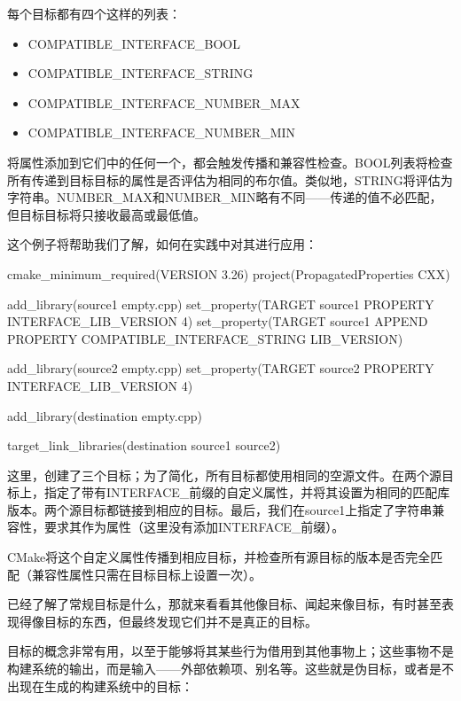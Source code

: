 每个目标都有四个这样的列表：

\begin{itemize}
\item
COMPATIBLE\_INTERFACE\_BOOL

\item
COMPATIBLE\_INTERFACE\_STRING

\item
COMPATIBLE\_INTERFACE\_NUMBER\_MAX

\item
COMPATIBLE\_INTERFACE\_NUMBER\_MIN
\end{itemize}

将属性添加到它们中的任何一个，都会触发传播和兼容性检查。BOOL列表将检查所有传递到目标目标的属性是否评估为相同的布尔值。类似地，STRING将评估为字符串。NUMBER\_MAX和NUMBER\_MIN略有不同——传递的值不必匹配，但目标目标将只接收最高或最低值。

这个例子将帮助我们了解，如何在实践中对其进行应用：


\begin{cmake}
cmake_minimum_required(VERSION 3.26)
project(PropagatedProperties CXX)

add_library(source1 empty.cpp)
set_property(TARGET source1 PROPERTY INTERFACE_LIB_VERSION 4)
set_property(TARGET source1 APPEND PROPERTY
             COMPATIBLE_INTERFACE_STRING LIB_VERSION)

add_library(source2 empty.cpp)
set_property(TARGET source2 PROPERTY INTERFACE_LIB_VERSION 4)

add_library(destination empty.cpp)

target_link_libraries(destination source1 source2)
\end{cmake}

这里，创建了三个目标；为了简化，所有目标都使用相同的空源文件。在两个源目标上，指定了带有INTERFACE\_前缀的自定义属性，并将其设置为相同的匹配库版本。两个源目标都链接到相应的目标。最后，我们在source1上指定了字符串兼容性，要求其作为属性（这里没有添加INTERFACE\_前缀）。

CMake将这个自定义属性传播到相应目标，并检查所有源目标的版本是否完全匹配（兼容性属性只需在目标目标上设置一次）。

已经了解了常规目标是什么，那就来看看其他像目标、闻起来像目标，有时甚至表现得像目标的东西，但最终发现它们并不是真正的目标。


目标的概念非常有用，以至于能够将其某些行为借用到其他事物上；这些事物不是构建系统的输出，而是输入——外部依赖项、别名等。这些就是伪目标，或者是不出现在生成的构建系统中的目标：

